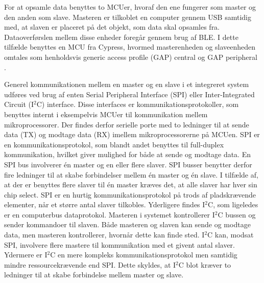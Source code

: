 For at opsamle data benyttes to MCUer, hvoraf den ene fungerer som master og den anden som slave. Masteren er tilkoblet en computer gennem USB samtidig med, at slaven er placeret på det objekt, som data skal opsamles fra. Dataoverførslen mellem disse enheder foregår gennem brug af BLE. I dette tilfælde benyttes en MCU fra Cypress, hvormed masterenheden og slaveenheden omtales som henholdsvis generic access profile (GAP) central og GAP peripheral \citep{Luthra2015}.

Generel kommunikationen mellem en master og en slave i et integreret system udføres ved brug af enten Serial Peripheral Interface (SPI) eller Inter-Integrated Circuit (I$^{2}$C) interface. Disse interfaces er kommunikationsprotokoller, som benyttes internt i eksempelvis MCUer til kommunikation mellem mikroprocessorer. Der findes derfor serielle porte med to ledninger til at sende data (TX) og modtage data (RX) imellem mikroprocessorerne på MCUen. \citep{Semiconductor2016} \newline
SPI er en kommunikationsprotokol, som blandt andet benyttes til full-duplex kommunikation, hvilket giver mulighed for både at sende og modtage data. En SPI bus involverer én master og en eller flere slaver. SPI busser benytter derfor fire ledninger til at skabe forbindelser mellem én master og én slave. I tilfælde af, at der er benyttes flere slaver til én master kræves det, at alle slaver har hver sin chip select. SPI er en hurtig kommunikationsprotokol på trods af pladskrævende elementer, når et større antal slaver tilkobles. \citep{Semiconductor2016,Sparkfun2016} \newline
Yderligere findes I$^{2}$C, som ligeledes er en computerbus dataprotokol. Masteren i systemet kontrollerer I$^{2}$C bussen og sender kommandoer til slaven. Både masteren og slaven kan sende og modtage data, men masteren kontrollerer, hvornår dette kan finde sted. I$^{2}$C kan, modsat SPI, involvere flere mastere til kommunikation med et givent antal slaver. Ydermere er I$^{2}$C en mere kompleks kommunikationsprotokol men samtidig mindre ressourcekrævende end SPI. Dette skyldes, at I$^{2}$C blot kræver to ledninger til at skabe forbindelse mellem master og slave.~\citep{Semiconductor2016,Sparkfun2016} %

